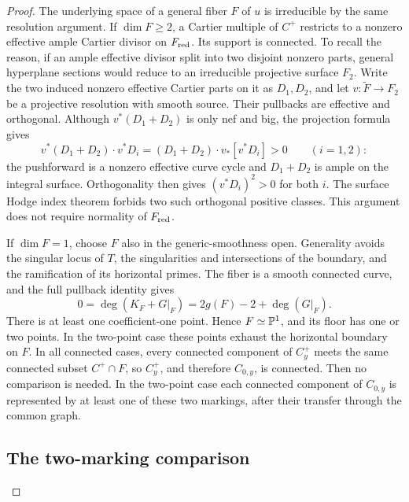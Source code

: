 \begin{proof}
The underlying space of a general fiber \(F\) of \(u\) is irreducible
by the same resolution argument.  If \(\dim F\geq2\), a Cartier multiple
of \(C^+\) restricts to a nonzero effective ample Cartier divisor on
\(F_{\mathrm{red}}\).  Its support is connected.  To recall the reason, if an
ample effective divisor split into two disjoint nonzero parts, general
hyperplane sections would reduce to an irreducible projective surface
\(F_2\).  Write the two induced nonzero effective Cartier parts on it as
\(D_1,D_2\), and let \(v:\widetilde F\to F_2\) be a projective resolution
with smooth source.  Their pullbacks are effective and orthogonal.  Although
\(v^*(D_1+D_2)\) is only nef and big, the projection formula gives
\[
 v^*(D_1+D_2)\cdot v^*D_i
 =(D_1+D_2)\cdot v_*[v^*D_i]>0\qquad(i=1,2):
\]
the pushforward is a nonzero effective curve cycle and \(D_1+D_2\) is
ample on the integral surface.  Orthogonality then gives
\((v^*D_i)^2>0\) for both \(i\).  The surface Hodge index theorem forbids
two such orthogonal positive classes.  This argument does not require
normality of \(F_{\mathrm{red}}\).

If \(\dim F=1\), choose \(F\) also in the generic-smoothness open.
Generality avoids the singular locus of \(T\), the
singularities and intersections of the boundary, and the ramification of
its horizontal primes.  The fiber is a smooth connected curve, and the
full pullback identity gives
\[
 0=\deg(K_F+G|_F)=2g(F)-2+\deg(G|_F).
\]
There is at least one coefficient-one point.  Hence \(F\simeq\mathbb P^1\),
and its floor has one or two points.  In the two-point case these points
exhaust the horizontal boundary on \(F\).  In all connected cases,
every connected component of \(C^+_y\) meets the same connected subset
\(C^+\cap F\), so \(C^+_y\), and therefore \(C_{0,y}\), is connected.
Then no comparison is needed.  In the two-point case each connected
component of \(C_{0,y}\) is represented by at least one of these two
markings, after their transfer through the common graph.

\subsection*{The two-marking comparison}


\end{proof}
